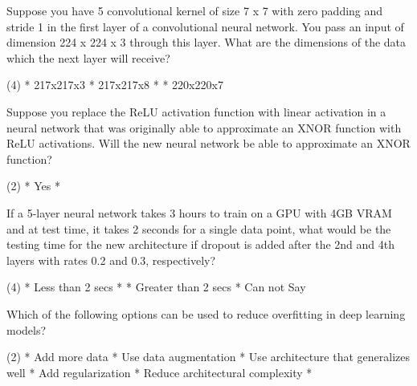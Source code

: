 \documentclass[10pt]{extarticle}
\begin{document}
\begin{exercise}
    Suppose you have 5 convolutional kernel of size 7 x 7 with zero padding and stride 1 in the first layer of a convolutional neural network. You pass an input of dimension 224 x 224 x 3 through this layer. What are the dimensions of the data which the next layer will receive? 
    \begin{choice} (4)
        * 217x217x3
        * 217x217x8
        *
        * 220x220x7
    \end{choice}
\end{exercise}
\begin{solution}
\end{solution}

\begin{exercise}
    Suppose you replace the ReLU activation function with linear activation in a neural network that was originally able to approximate an XNOR function with ReLU activations. Will the new neural network be able to approximate an XNOR function?
    \begin{choice} (2)
        * Yes
        *
    \end{choice}
\end{exercise}
\begin{solution}
\end{solution}

\begin{exercise}
    If a 5-layer neural network takes 3 hours to train on a GPU with 4GB VRAM and at test time, it takes 2 seconds for a single data point, what would be the testing time for the new architecture if dropout is added after the 2nd and 4th layers with rates 0.2 and 0.3, respectively?
    \begin{choice} (4)
        * Less than 2 secs
        *
        * Greater than 2 secs
        * Can not Say
    \end{choice}
\end{exercise}
\begin{solution}
\end{solution}

\begin{exercise}
    Which of the following options can be used to reduce overfitting in deep learning models?
    \begin{choice} (2)
        * Add more data
        * Use data augmentation 
        * Use architecture that generalizes well
        * Add regularization
        * Reduce architectural complexity
        *
    \end{choice}
\end{exercise}
\begin{solution}
\end{solution}
\end{document}
